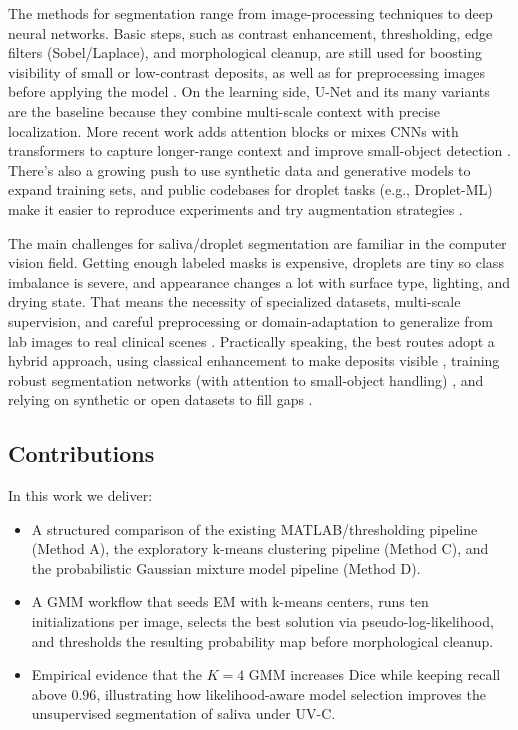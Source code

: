 The methods for segmentation range from image-processing techniques to deep neural networks. Basic steps, such as contrast enhancement, thresholding, edge filters (Sobel/Laplace), and morphological cleanup, are still used for boosting visibility of small or low-contrast deposits, as well as for preprocessing images before applying the model \cite{ren2022medical,deng2011edge}. On the learning side, U-Net and its many variants are the baseline because they combine multi-scale context with precise localization. More recent work adds attention blocks or mixes CNNs with transformers to capture longer-range context and improve small-object detection \cite{rahman2021exploring,dwivedi2025optimizing}. There’s also a growing push to use synthetic data and generative models to expand training sets, and public codebases for droplet tasks (e.g., Droplet-ML) make it easier to reproduce experiments and try augmentation strategies \cite{pham2024enhanced,sarritzu2024dropletml}.

The main challenges for saliva/droplet segmentation are familiar in the computer vision field. Getting enough labeled masks is expensive, droplets are tiny so class imbalance is severe, and appearance changes a lot with surface type, lighting, and drying state. That means the necessity of specialized datasets, multi-scale supervision, and careful preprocessing or domain-adaptation to generalize from lab images to real clinical scenes \cite{rahman2021exploring,dwivedi2025optimizing}. Practically speaking, the best routes adopt a hybrid approach, using classical enhancement to make deposits visible \cite{ren2022medical}, training robust segmentation networks (with attention to small-object handling) \cite{dwivedi2025optimizing}, and relying on synthetic or open datasets to fill gaps \cite{pham2024enhanced,sarritzu2024dropletml}.

\subsection{Contributions}

In this work we deliver:
\begin{itemize}
    \item A structured comparison of the existing MATLAB/thresholding pipeline (Method A), the exploratory k-means clustering pipeline (Method C), and the probabilistic Gaussian mixture model pipeline (Method D).
    \item A GMM workflow that seeds EM with k-means centers, runs ten initializations per image, selects the best solution via pseudo-log-likelihood, and thresholds the resulting probability map before morphological cleanup.
    \item Empirical evidence that the \(K=4\) GMM increases Dice while keeping recall above \(0.96\), illustrating how likelihood-aware model selection improves the unsupervised segmentation of saliva under UV-C.
\end{itemize}
